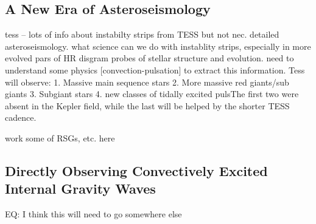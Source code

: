 {\color{blue}
\subsection{A New Era of Asteroseismology}

tess -- lots of info about instabilty strips from TESS but not nec. detailed asteroseismology.  what science can we do with instablity strips, especially in more evolved pars of HR disgram  probes of stellar structure and evolution.   need to understand some physics [convection-pulsation] to extract this information.   Tess will observe: 1. Massive main sequence stars 2. More massive red giants/sub giants 3. Subgiant stars 4.  new classes of tidally excited pulsThe first two were absent in the Kepler field, while the last will be helped by the shorter TESS cadence.

work some of RSGs, etc. here

\subsection{Directly Observing Convectively Excited Internal Gravity Waves}

EQ: I think this will need to go somewhere else



}